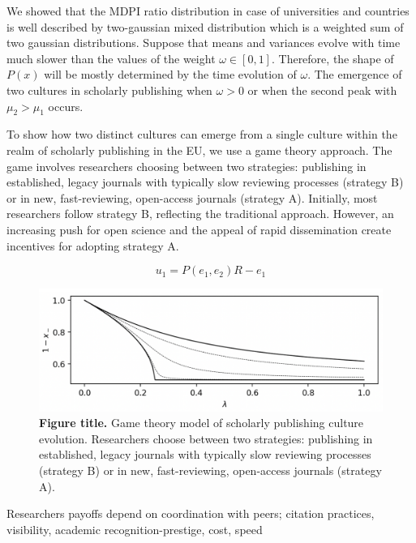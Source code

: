 \documentclass[amsfonts, amssymb, prl, superscriptaddress, notitlepage, twocolumn, nofootinbib]{revtex4-2}
\begin{document}
We showed that the MDPI ratio distribution in case of universities and countries is well described by two-gaussian mixed distribution which is a weighted sum of two gaussian distributions. Suppose that means and variances evolve with time much slower than the values of the weight $\omega\in [0, 1]$.  Therefore, the shape of $P(x)$ will be mostly determined by the time evolution of $\omega$. The emergence of two cultures in scholarly publishing when $\omega > 0$ or when the second peak with $\mu_2 >\mu_1$ occurs.  

To show how two distinct cultures can emerge from a single culture within the realm of scholarly publishing in the EU, we use a game theory approach. The game involves researchers choosing between two strategies: publishing in established, legacy journals with typically slow reviewing processes (strategy B) or in new, fast-reviewing, open-access journals (strategy A). Initially, most researchers follow strategy B, reflecting the traditional approach. However, an increasing push for open science and the appeal of rapid dissemination create incentives for adopting strategy A. 

\begin{equation}
    u_1 = P(e_1, e_2)R - e_1
\end{equation}

\begin{figure}
    \centering
    \includegraphics[width=1.0\linewidth]{Fig07.png}
    \caption{\label{fig:fig7} {\bf Figure title.} Game theory model of scholarly publishing culture evolution. Researchers choose between two strategies: publishing in established, legacy journals with typically slow reviewing processes (strategy B) or in new, fast-reviewing, open-access journals (strategy A). 
}
\end{figure}

Researchers payoffs depend on coordination with peers; citation practices, visibility, academic recognition-prestige, cost, speed  
\end{document}
